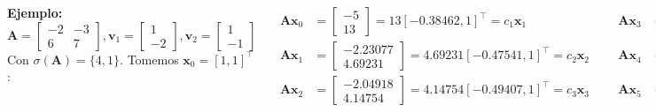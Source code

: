 \documentclass[9pt, aspectratio=169]{beamer}
\begin{document}

\begin{frame}
\begin{columns}[t]
\cx
\textbf{Ejemplo:}
\[ \bm{A} = \begin{bmatrix} -2 & -3 \\ 6 & 7 \end{bmatrix}, \bm{v}_1 = \begin{bmatrix} 1 \\ -2 \end{bmatrix}, \bm{v}_2 = \begin{bmatrix} 1 \\ -1 \end{bmatrix}  \]
Con $\sigma(\bm{A}) = \{4, 1\}$. Tomemos $\bm{x}_0 = [1, 1]^{\intercal}$:

\begin{align*} 
    \bm{A}\bm{x}_0 &= \begin{bmatrix} -5 \\ 13 \end{bmatrix} = 13 [-0.38462, 1]^{\intercal} = c_1 \bm{x}_1 \\
    \bm{A}\bm{x}_1 &= \begin{bmatrix} -2.23077 \\ 4.69231 \end{bmatrix} = 4.69231 [-0.47541, 1]^{\intercal} = c_2 \bm{x}_2 \\
    \bm{A}\bm{x}_2 &= \begin{bmatrix} -2.04918 \\ 4.14754 \end{bmatrix} = 4.14754 [ -0.49407, 1 ]^{\intercal} = c_3 \bm{x}_3
\end{align*}

\cx
\begin{align*} 
    \bm{A}\bm{x}_3 &= \begin{bmatrix} -2.01186 \\  4.03557 \end{bmatrix} = 4.03557 [ -0.49853, 1 ]^{\intercal} = c_4 \bm{x}_4 \\
    \bm{A}\bm{x}_4 &= \begin{bmatrix} -2.00294 \\ 4.00881 \end{bmatrix} = 4.00881 [ -0.49963, 1 ]^{\intercal} = c_5 \bm{x}_5 \\
    \bm{A}\bm{x}_5 &= \begin{bmatrix} -2.00073 \\ 4.00220 \end{bmatrix} = 4.00220 [ -0.49991, 1]^{\intercal} = c_6 \bm{x}_6 \\
\end{align*}


\end{columns}
\end{frame}
\end{document}
